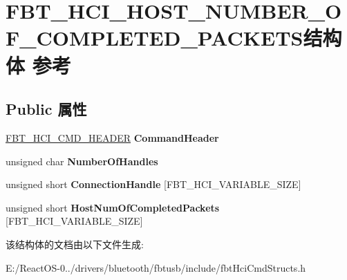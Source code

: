 \hypertarget{struct_f_b_t___h_c_i___h_o_s_t___n_u_m_b_e_r___o_f___c_o_m_p_l_e_t_e_d___p_a_c_k_e_t_s}{}\section{F\+B\+T\+\_\+\+H\+C\+I\+\_\+\+H\+O\+S\+T\+\_\+\+N\+U\+M\+B\+E\+R\+\_\+\+O\+F\+\_\+\+C\+O\+M\+P\+L\+E\+T\+E\+D\+\_\+\+P\+A\+C\+K\+E\+T\+S结构体 参考}
\label{struct_f_b_t___h_c_i___h_o_s_t___n_u_m_b_e_r___o_f___c_o_m_p_l_e_t_e_d___p_a_c_k_e_t_s}
\subsection*{Public 属性}
\begin{DoxyCompactItemize}
\item 
\mbox{\label{struct_f_b_t___h_c_i___h_o_s_t___n_u_m_b_e_r___o_f___c_o_m_p_l_e_t_e_d___p_a_c_k_e_t_s_a1c3865fce1a6488bf04d301e304cda4a}} 
\hyperlink{struct_f_b_t___h_c_i___c_m_d___h_e_a_d_e_r}{F\+B\+T\+\_\+\+H\+C\+I\+\_\+\+C\+M\+D\+\_\+\+H\+E\+A\+D\+ER} {\bfseries Command\+Header}
\item 
\mbox{\label{struct_f_b_t___h_c_i___h_o_s_t___n_u_m_b_e_r___o_f___c_o_m_p_l_e_t_e_d___p_a_c_k_e_t_s_a080d19601a1ccb4154ee9eeb6adcc549}} 
unsigned char {\bfseries Number\+Of\+Handles}
\item 
\mbox{\label{struct_f_b_t___h_c_i___h_o_s_t___n_u_m_b_e_r___o_f___c_o_m_p_l_e_t_e_d___p_a_c_k_e_t_s_a5d4d858f3f8c5c026a1006bd7f67e664}} 
unsigned short {\bfseries Connection\+Handle} \mbox{[}F\+B\+T\+\_\+\+H\+C\+I\+\_\+\+V\+A\+R\+I\+A\+B\+L\+E\+\_\+\+S\+I\+ZE\mbox{]}
\item 
\mbox{\label{struct_f_b_t___h_c_i___h_o_s_t___n_u_m_b_e_r___o_f___c_o_m_p_l_e_t_e_d___p_a_c_k_e_t_s_a6a4a81aebb08cde3b57136a892340cc7}} 
unsigned short {\bfseries Host\+Num\+Of\+Completed\+Packets} \mbox{[}F\+B\+T\+\_\+\+H\+C\+I\+\_\+\+V\+A\+R\+I\+A\+B\+L\+E\+\_\+\+S\+I\+ZE\mbox{]}
\end{DoxyCompactItemize}


该结构体的文档由以下文件生成\+:\begin{DoxyCompactItemize}
\item 
E\+:/\+React\+O\+S-\/0../drivers/bluetooth/fbtusb/include/fbt\+Hci\+Cmd\+Structs.\+h\end{DoxyCompactItemize}
